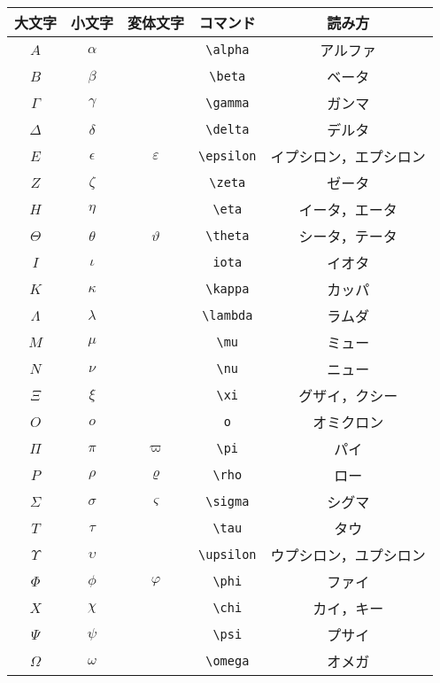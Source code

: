\renewcommand{\arraystretch}{1}
\begin{longtable}[h]{|c|c|c|c|c|}
\hline
大文字 & 小文字 & 変体文字 & コマンド & 読み方 \\ \hline
$A$ & $\alpha$ &  & \verb|\alpha| & アルファ \\ \hline
$B$ & $\beta$ &  & \verb|\beta| & ベータ \\ \hline
$\Gamma$ & $\gamma$ &  & \verb|\gamma| & ガンマ \\ \hline
$\Delta$ & $\delta$ &  & \verb|\delta| & デルタ \\ \hline
$E$ & $\epsilon$ & $\varepsilon$ & \verb|\epsilon| & イプシロン，エプシロン \\ \hline
$Z$ & $\zeta$ &  & \verb|\zeta| & ゼータ \\ \hline
$H$ & $\eta$ &  & \verb|\eta| & イータ，エータ \\ \hline
$\Theta$ & $\theta$ & $\vartheta$ & \verb|\theta| & シータ，テータ \\ \hline
$I$ & $\iota$ &  & \verb|iota| & イオタ \\ \hline
$K$ & $\kappa$ &  & \verb|\kappa| & カッパ \\ \hline
$\Lambda$ & $\lambda$ &  & \verb|\lambda| & ラムダ \\ \hline
$M$ & $\mu$ &  & \verb|\mu| & ミュー \\ \hline
$N$ & $\nu$ &  & \verb|\nu| & ニュー \\ \hline
$\Xi$ & $\xi$ &  & \verb|\xi| & グザイ，クシー \\ \hline
$O$ & $o$ &  & \verb|o| & オミクロン \\ \hline
$\Pi$ & $\pi$ & $\varpi$ & \verb|\pi| & パイ \\ \hline
$P$ & $\rho$ & $\varrho$ & \verb|\rho| & ロー \\ \hline
$\Sigma$ & $\sigma$ & $\varsigma$ & \verb|\sigma| & シグマ \\ \hline
$T$ & $\tau$ &  & \verb|\tau| & タウ \\ \hline
$\Upsilon$ & $\upsilon$ &  & \verb|\upsilon| & ウプシロン，ユプシロン \\ \hline
$\Phi$ & $\phi$ & $\varphi$ & \verb|\phi| & ファイ \\ \hline
$X$ & $\chi$ &  & \verb|\chi| & カイ，キー \\ \hline
$\Psi$ & $\psi$ &  & \verb|\psi| & プサイ \\ \hline
$\Omega$ & $\omega$ &  & \verb|\omega| & オメガ \\ \hline
\end{longtable}



